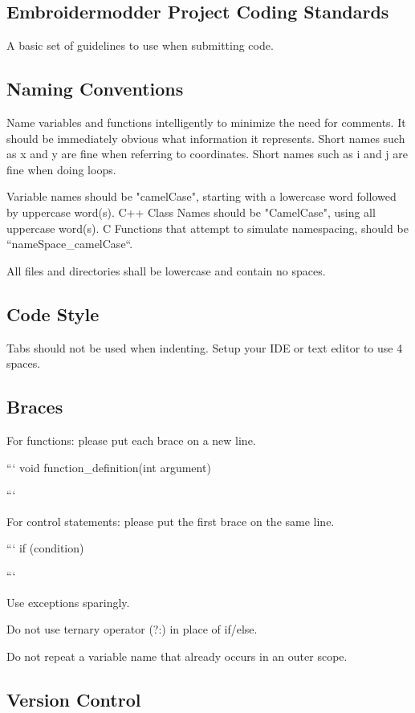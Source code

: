 \documentclass[10pt]{report}
\begin{document}
\subsection{Embroidermodder Project Coding Standards}

A basic set of guidelines to use when submitting code.

\subsection{Naming Conventions}

Name variables and functions intelligently to minimize the need for
comments. It should be immediately obvious what information it
represents. Short names such as x and y are fine when referring to
coordinates. Short names such as i and j are fine when doing loops.

Variable names should be "camelCase", starting with a lowercase word
followed by uppercase word(s). C++ Class Names should be "CamelCase",
using all uppercase word(s). C Functions that attempt to simulate namespacing,
should be ``nameSpace\_camelCase``.

All files and directories shall be lowercase and contain no spaces.

\subsection{Code Style}

Tabs should not be used when indenting. Setup your IDE or text editor to
use 4 spaces.

\subsection{Braces}

For functions: please put each brace on a new line.

```
void function\_definition(int argument)
{

}
```

For control statements: please put the first brace on the same line.

```
if (condition) {

}
```

Use exceptions sparingly.

Do not use ternary operator (?:) in place of if/else.

Do not repeat a variable name that already occurs in an outer scope.

\subsection{Version Control}
\end{document}
